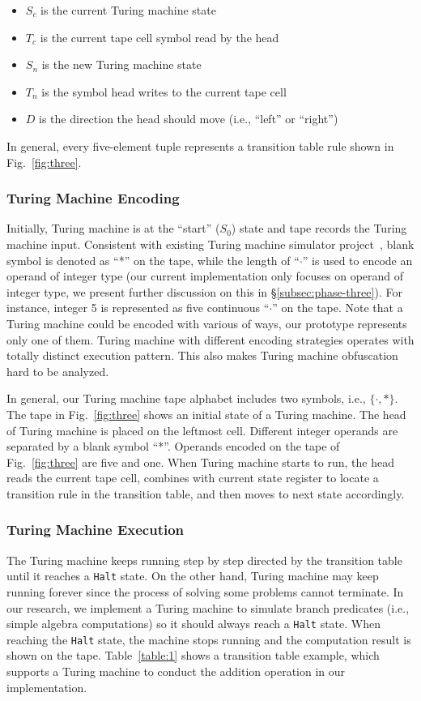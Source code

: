 \documentclass[lnicst]{svmultln}
\newcommand{\F}{Fig.}
\begin{document}
\begin{itemize}
  \item \(S_c\) is the current Turing machine state
  \item \(T_c\) is the current tape cell symbol read by the head
  \item \(S_n\) is the new Turing machine state
  \item \(T_n\) is the symbol head writes to the current tape cell
  \item \(D\) is the direction the head should move (i.e., ``left'' or
    ``right'')
\end{itemize}

In general, every five-element tuple represents a transition table rule shown in
\F~\ref{fig:three}.

\subsubsection{Turing Machine Encoding}
Initially, Turing machine is at the ``start'' (\(S_0\)) state and tape records
the Turing machine input. Consistent with existing Turing machine simulator
project~\cite{SingleTape}, blank symbol is denoted as ``*'' on the tape, while
the length of ``$\cdot$'' is used to encode an operand of integer type (our
current implementation only focuses on operand of integer type, we present
further discussion on this in \S\ref{subsec:phase-three}). For instance, integer
5 is represented as five continuous ``$\cdot$'' on the tape. Note that a Turing
machine could be encoded with various of ways, our prototype represents only one
of them. Turing machine with different encoding strategies operates with totally
distinct execution pattern. This also makes Turing machine obfuscation hard to
be analyzed.

In general, our Turing machine tape alphabet includes two symbols, i.e.,
$\{\cdot,*\}$. The tape in \F~\ref{fig:three} shows an initial state of a Turing
machine. The head of Turing machine is placed on the leftmost cell. Different
integer operands are separated by a blank symbol ``*''. Operands encoded on
the tape of \F~\ref{fig:three} are five and one. When Turing machine starts to
run, the head reads the current tape cell, combines with current state register
to locate a transition rule in the transition table, and then moves to next
state accordingly.

\subsubsection{Turing Machine Execution}
The Turing machine keeps running step by step directed by the transition table
until it reaches a \texttt{Halt} state. On the other hand, Turing machine may
keep running forever since the process of solving some problems cannot
terminate. In our research, we implement a Turing machine to simulate branch
predicates (i.e., simple algebra computations) so it should always reach a
\texttt{Halt} state. When reaching the \texttt{Halt} state, the machine stops
running and the computation result is shown on the tape. Table~\ref{table:1}
shows a transition table example, which supports a Turing machine to conduct the
addition operation in our implementation.
\end{document}
